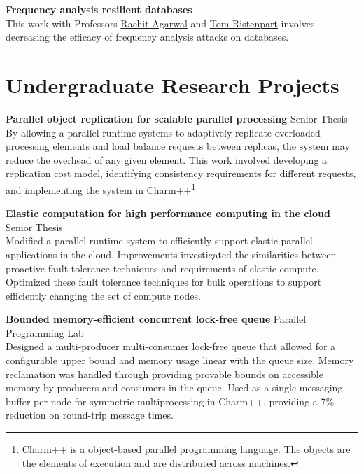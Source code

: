 \documentclass[10pt]{article}
\newcommand{\leftrightrow}[2]{
	#1 \hfill #2 \\
}
\newcommand{\researchblock}[3]{
	\leftrightrow{\textbf{#1}}{#2}#3
}
\begin{document}
\vspace{0.6em}

\researchblock{Frequency analysis resilient databases}{}
{
	This work with Professors \href{http://www.cs.cornell.edu/~ragarwal/}{Rachit Agarwal}  and \href{https://rist.tech.cornell.edu/}{Tom Ristenpart} involves decreasing the efficacy of frequency analysis attacks on databases.
}

\section{Undergraduate Research Projects}
\vspace{0.1em}
\researchblock{Parallel object replication for scalable parallel processing}{Senior Thesis}
{
	By allowing a parallel runtime systems to adaptively replicate overloaded processing elements and load balance requests between replicas, the system may reduce the overhead of any given element. This work involved developing a replication cost model, identifying consistency requirements for different requests, and
	implementing the system in Charm++\footnote[1]{
	\href{http://charm.cs.illinois.edu/research/charm}{Charm++} is a object-based parallel programming language. The objects are the elements of execution and are distributed across machines.}
}

\vspace{0.6em}

\researchblock{Elastic computation for high performance computing in the cloud}{Senior Thesis}
{
	Modified a parallel runtime system to efficiently support elastic parallel applications in the cloud. Improvements investigated the similarities between proactive fault tolerance techniques and requirements of elastic compute. Optimized these fault tolerance techniques for bulk operations to support efficiently changing the set of compute nodes.
}

\vspace{0.6em}

\researchblock{Bounded memory-efficient concurrent lock-free queue}{Parallel Programming Lab}
{
	Designed a multi-producer multi-consumer lock-free queue that allowed for a configurable upper bound and memory usage linear with the queue size. Memory reclamation was handled through providing provable bounds on accessible memory by producers and consumers in the queue. Used as a single messaging buffer per node for symmetric multiprocessing in Charm++\footnotemark[1], providing a 7\% reduction on round-trip message times.
}
\end{document}
